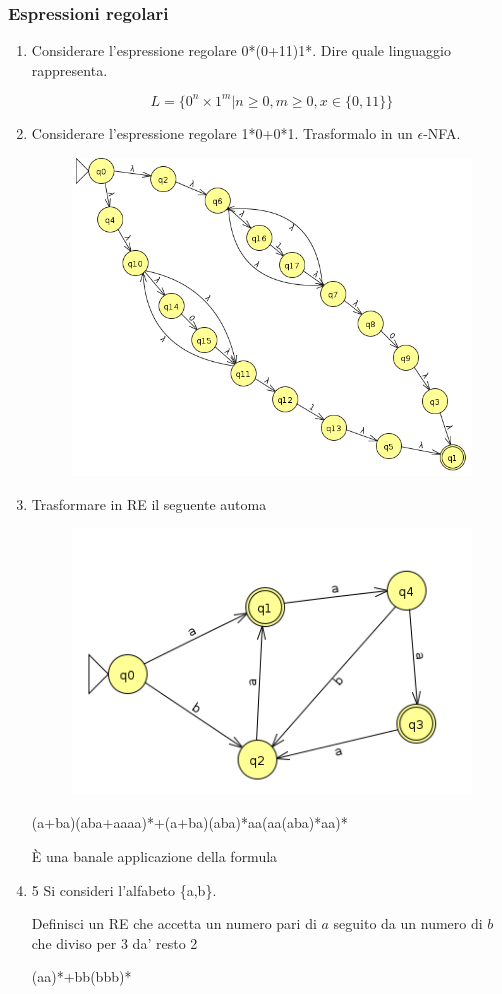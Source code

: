 \subsubsection{Espressioni regolari}
\begin{enumerate}
\item Considerare l'espressione regolare 0*(0+11)1*. Dire quale linguaggio rappresenta.

  \[ L=\{ 0^n \times 1^m | n \geq 0, m \geq 0, x \in \{0,11\} \} \]
  
\newpage
\item Considerare l'espressione regolare 1*0+0*1. Trasformalo in un $\epsilon$-NFA.
  \begin{figure}[ht]
    \includegraphics[scale =0.4]{media/esercizio3jflap.jff.png}
    \centering
  \end{figure}

\item Trasformare in RE il seguente automa

  \begin{figure}[ht]
    \includegraphics[scale =0.4]{media/nfa2re.jff.png}
    \centering
  \end{figure}
  (a+ba)(aba+aaaa)*+(a+ba)(aba)*aa(aa(aba)*aa)*

  È una banale applicazione della formula


\item 5 Si consideri l'alfabeto \{a,b\}.

  Definisci un RE che accetta un numero pari di $a$ seguito da un numero di $b$ che diviso per 3 da' resto 2

  (aa)*+bb(bbb)*
\end{enumerate}
